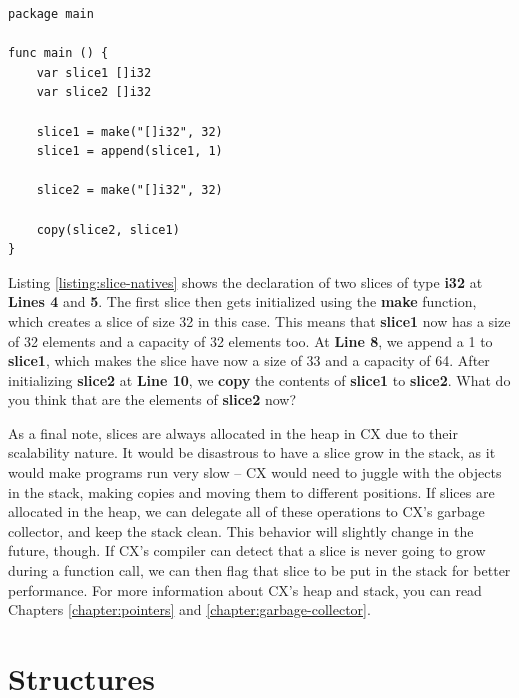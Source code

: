\documentclass[11pt,fleqn,openany]{book} %
\begin{document}
\begin{lstlisting}[caption={Slice-specific Native Functions},captionpos=b,label={listing:slice-natives}]
package main

func main () {
	var slice1 []i32
    var slice2 []i32
    
    slice1 = make("[]i32", 32)
    slice1 = append(slice1, 1)
    
    slice2 = make("[]i32", 32)
    
    copy(slice2, slice1)
}
\end{lstlisting}

Listing \ref{listing:slice-natives} shows the declaration of two slices of type \textbf{i32} at \textbf{Lines 4} and \textbf{5}. The first slice then gets initialized using the \textbf{make} function, which creates a slice of size 32 in this case. This means that \textbf{slice1} now has a size of 32 elements and a capacity of 32 elements too. At \textbf{Line 8}, we append a 1 to \textbf{slice1}, which makes the slice have now a size of 33 and a capacity of 64. After initializing \textbf{slice2} at \textbf{Line 10}, we \textbf{copy} the contents of \textbf{slice1} to \textbf{slice2}. What do you think that are the elements of \textbf{slice2} now?

As a final note, slices are always allocated in the heap in CX due to their scalability nature. It would be disastrous to have a slice grow in the stack, as it would make programs run very slow -- CX would need to juggle with the objects in the stack, making copies and moving them to different positions. If slices are allocated in the heap, we can delegate all of these operations to CX's garbage collector, and keep the stack clean. This behavior will slightly change in the future, though. If CX's compiler can detect that a slice is never going to grow during a function call, we can then flag that slice to be put in the stack for better performance. For more information about CX's heap and stack, you can read Chapters \ref{chapter:pointers} and \ref{chapter:garbage-collector}.

\section{Structures}

\end{document}
